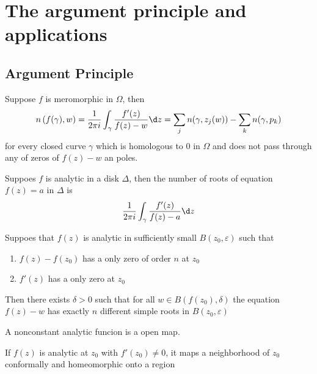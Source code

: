 \documentclass[12pt, oneside]{book}
\begin{document}
\section{The argument principle and applications}
\subsection{Argument Principle}


\begin{theorem}
    Suppose $f$ is meromorphic in $\Omega$, then
    \begin{equation*}
        n\left( f(\gamma),w \right)
        =
        \frac{1}{2\pi i}\int_\gamma \frac{f'(z)}{f(z)-w}\d z
        =
        \sum_j n(\gamma,z_j(w))-\sum_k n(\gamma,p_k)
    \end{equation*}
    for every closed curve $\gamma$ which is homologous to $0$ in $\Omega$ and does not pass  through any of zeros of $f(z)-w$ an poles.
\end{theorem}

\begin{corollary}
    Suppoes $f$ is analytic in a disk $\Delta $, then the number of roots of equation $f(z)=a$ in $\Delta$ is
    \begin{equation*}
        \frac{1}{2\pi i}\int_\gamma \frac{f'(z)}{f(z)-a}\d z
    \end{equation*}
\end{corollary}

\begin{corollary}
    Suppoes that $f(z)$ is analytic in sufficiently small  $B\left(z_0,\varepsilon\right)$ such that
    \begin{enumerate}[label=(\roman*)]
        \item $f(z)-f(z_0)$ has a only zero of order $n$ at $z_0$
        \item $f'(z)$ has a only zero at $z_0$
    \end{enumerate}
    Then there exists $\delta>0 $ such that for all $w \in B\left(f(z_0),\delta\right)$ the equation $f(z)-w$ has exactly $n$ different simple roots in $B\left(z_0,\varepsilon\right)$
\end{corollary}


\begin{corollary}
    A nonconstant analytic funcion is a open map.
\end{corollary}

\begin{corollary}
    If $f(z)$ is analytic at $z_0$ with $f'(z_0)\neq 0$,
    it maps a neighborhood of $z_0$ conformally and homeomorphic onto a region
\end{corollary}
\end{document}
